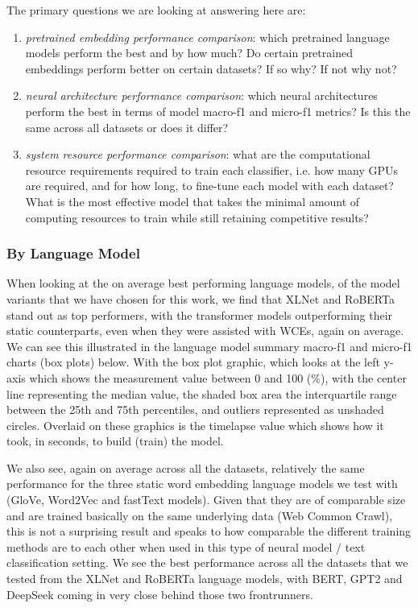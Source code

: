 \documentclass[final]{clv2025}
\begin{document}
The primary questions we are looking at answering here are:
\begin{enumerate}
	\setlength{\itemsep}{0pt}
  	\setlength{\parskip}{0pt}
    \item \textit{pretrained embedding performance comparison}: which pretrained language models perform the best and by how much? Do certain pretrained embeddings perform better on certain datasets? If so why? If not why not?
    \item 	\textit{neural architecture performance comparison}: which neural architectures perform the best in terms of model macro-f1 and micro-f1 metrics? Is this the same across all datasets or does it differ?
    \item \textit{system resource performance comparison}: what are the computational resource requirements required to train each classifier, i.e. how many GPUs are required, and for how long, to fine-tune each model with each dataset? What is the most effective model that takes the minimal amount of computing resources to train while still retaining competitive results?
\end{enumerate}


\subsubsection{By Language Model} 

When looking at the on average best performing language models, of the model variants that we have chosen for this work, we find that XLNet and RoBERTa stand out as top performers, with the transformer models outperforming their static counterparts, even when they were assisted with WCEs, again on average. We can see this illustrated in the language model summary macro-f1 and micro-f1 charts (box plots) below. With the box plot graphic, which looks at the left y-axis which shows the measurement value between 0 and 100 (\%), with the center line representing the median value, the shaded box area the interquartile range between the 25th and 75th percentiles, and outliers represented as unshaded circles. Overlaid on these graphics is the timelapse value which shows how it took, in seconds, to build (train) the model.

We also see, again on average across all the datasets, relatively the same performance for the three static word embedding language models we test with (GloVe, Word2Vec and fastText models). Given that they are of comparable size and are trained basically on the same underlying data (Web Common Crawl), this is not a surprising result and speaks to how comparable the different training methods are to each other when used in this type of neural model / text classification setting. We see the best performance across all the datasets that we tested from the XLNet and RoBERTa language models, with BERT, GPT2 and DeepSeek coming in very close behind those two frontrunners. 
\end{document}

